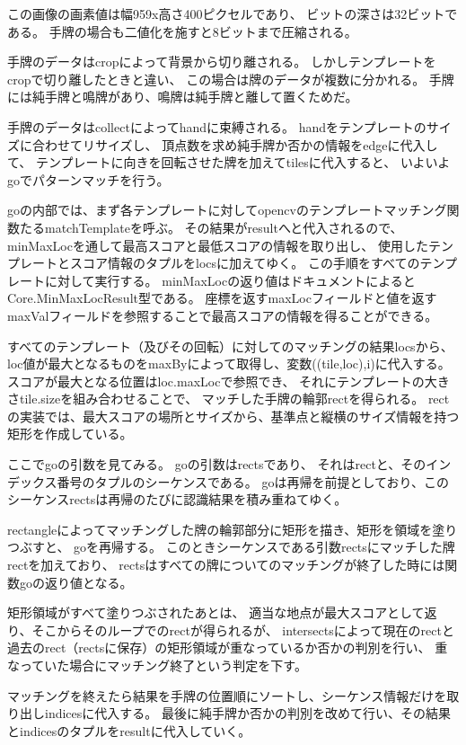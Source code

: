 \documentclass{jsarticle}
\begin{document}
\begin{multicols}{2}
この画像の画素値は幅959x高さ400ピクセルであり、
ビットの深さは32ビットである。
手牌の場合も二値化を施すと8ビットまで圧縮される。

手牌のデータはcropによって背景から切り離される。
しかしテンプレートをcropで切り離したときと違い、
この場合は牌のデータが複数に分かれる。
手牌には純手牌と鳴牌があり、鳴牌は純手牌と離して置くためだ。

手牌のデータはcollectによってhandに束縛される。
handをテンプレートのサイズに合わせてリサイズし、
頂点数を求め純手牌か否かの情報をedgeに代入して、
テンプレートに向きを回転させた牌を加えてtilesに代入すると、
いよいよgoでパターンマッチを行う。
	
goの内部では、まず各テンプレートに対してopencvのテンプレートマッチング関数たるmatchTemplateを呼ぶ。
その結果がresultへと代入されるので、
minMaxLocを通して最高スコアと最低スコアの情報を取り出し、
使用したテンプレートとスコア情報のタプルをlocsに加えてゆく。
この手順をすべてのテンプレートに対して実行する。
minMaxLocの返り値はドキュメントによると\cite{minMaxLoc}
Core.MinMaxLocResult型である。
座標を返すmaxLocフィールドと値を返すmaxValフィールドを参照することで最高スコアの情報を得ることができる。

すべてのテンプレート（及びその回転）に対してのマッチングの結果locsから、
loc値が最大となるものをmaxByによって取得し、変数((tile,loc),i)に代入する。
スコアが最大となる位置はloc.maxLocで参照でき、
それにテンプレートの大きさtile.sizeを組み合わせることで、
マッチした手牌の輪郭rectを得られる。
rectの実装では、最大スコアの場所とサイズから、基準点と縦横のサイズ情報を持つ矩形を作成している。

ここでgoの引数を見てみる。
goの引数はrectsであり、
それはrectと、そのインデックス番号のタプルのシーケンスである。
goは再帰を前提としており、このシーケンスrectsは再帰のたびに認識結果を積み重ねてゆく。

rectangleによってマッチングした牌の輪郭部分に矩形を描き、矩形を領域を塗りつぶすと、
goを再帰する。
このときシーケンスである引数rectsにマッチした牌rectを加えており、
rectsはすべての牌についてのマッチングが終了した時には関数goの返り値となる。

矩形領域がすべて塗りつぶされたあとは、
適当な地点が最大スコアとして返り、そこからそのループでのrectが得られるが、
intersectsによって現在のrectと過去のrect（rectsに保存）の矩形領域が重なっているか否かの判別を行い、
重なっていた場合にマッチング終了という判定を下す。

マッチングを終えたら結果を手牌の位置順にソートし、シーケンス情報だけを取り出しindicesに代入する。
最後に純手牌か否かの判別を改めて行い、その結果とindicesのタプルをresultに代入していく。


\end{multicols}
\end{document}
